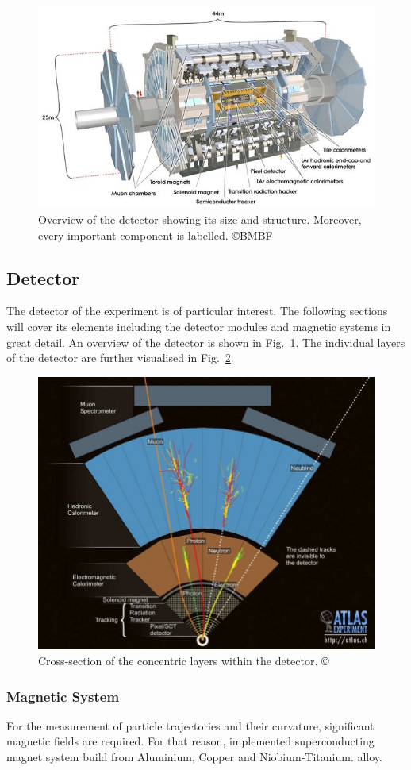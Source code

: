\documentclass[bachelor,ngerman,english]{GAUBM}
\begin{document}
\begin{figure}[t]
    \centering
    \includegraphics[width=.61\textwidth]{figures/lhc/atlas_overview.jpg}
    \caption{Overview of the \atlas detector showing its size and structure. Moreover, every important component is labelled. \copyright{BMBF}}
    \label{fig:atlas_overview}
\end{figure}

\subsection{Detector}
\label{sec:exp:atlas_detector}
The detector of the \atlas experiment is of particular interest. The following sections will cover its elements including the detector modules and magnetic systems in great detail. An overview of the detector is shown in Fig.~\ref{fig:atlas_overview}. The individual layers of the detector are further visualised in Fig.~\ref{fig:atlas_layers}. 

\begin{figure}[t]
    \centering
    \includegraphics[width=.61\textwidth]{figures/lhc/atlas_layers.png}
    \caption{Cross-section of the concentric layers within the \atlas detector. \copyright{\cern}}
    \label{fig:atlas_layers}
\end{figure}

\subsubsection*{Magnetic System}
For the measurement of particle trajectories and their curvature, significant magnetic fields are required. For that reason, \atlas implemented superconducting magnet system build from Aluminium, Copper and Niobium-Titanium. alloy. 
\end{document}
